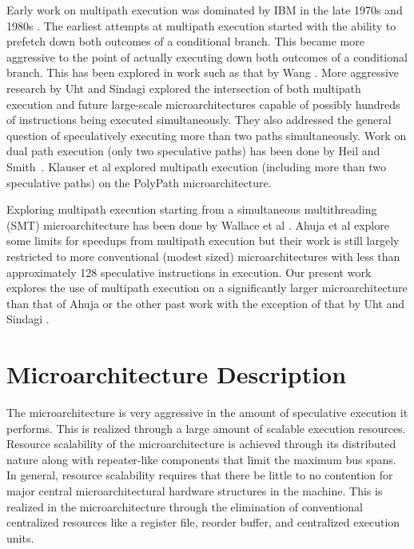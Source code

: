 \documentclass[10pt,dvips]{article}
\begin{document}
Early work on multipath execution was
dominated by IBM in the
late 1970s and 1980s \cite{Conners79}.
The earliest attempts at multipath
execution started with the ability to prefetch down both
outcomes of a conditional branch.  This became more aggressive
to the point of actually executing down both outcomes of
a conditional branch.  This has
been explored in work such as that by
Wang \cite{Wang90}.  
More aggressive research by Uht and
Sindagi \cite{Uht95} explored the intersection of both
multipath execution and future large-scale microarchitectures
capable of possibly hundreds of instructions being executed simultaneously.
They also addressed the general question of speculatively executing
more than two paths simultaneously.
Work on dual path execution (only two speculative paths) has
been done by Heil and Smith~\cite{Heil96}.
Klauser et al explored multipath execution (including more than two
speculative paths)
on the PolyPath microarchitecture.

Exploring multipath execution starting from a simultaneous multithreading (SMT)
microarchitecture has been done by
Wallace et al \cite{Wallace98}.  
Ahuja et al \cite{Ahuja98} explore some limits for speedups from
multipath execution but their work is still largely restricted to more
conventional (modest sized) microarchitectures with less than 
approximately 128
speculative instructions in execution.  Our present work explores the use
of multipath execution on a significantly larger microarchitecture than
that of Ahuja or the other past work with the exception of that by
Uht and Sindagi \cite{Uht95}.
%
\section{Microarchitecture Description}
%
The microarchitecture is very aggressive in the amount of speculative
execution it performs.
This is realized through a large amount of scalable execution
resources.
Resource scalability
of the microarchitecture is achieved through its distributed nature
along with repeater-like components that limit the maximum bus
spans.
In general, resource scalability requires that there be little to no 
contention for major
central microarchitectural hardware structures in the machine.
This is realized in the 
microarchitecture through the elimination
of conventional centralized resources like a register file,
reorder buffer, and centralized execution units.
\end{document}
